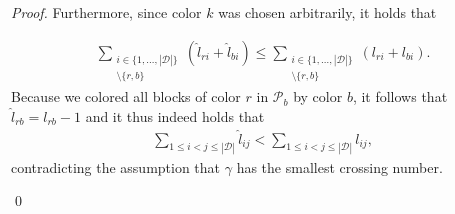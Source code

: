 \documentclass{llncs}
\begin{document}
\begin{proof}
Furthermore, since color $k$ was chosen arbitrarily, it holds that

\begin{align*}
\sum_{\substack{i \in \{1, \ldots, |\mathcal{D}|\}   \\ \setminus \{r,b\}}} (\hat l_{ri} + \hat l_{bi})    \leq  \sum_{\substack{i \in \{1, \ldots, |\mathcal{D}|\}   \\ \setminus \{r,b\}}} ( l_{ri} +  l_{bi}).
\end{align*}
Because we colored all blocks of color $r$ in $\mathcal{P}_b$ by color $b$, it follows that $\hat{l}_{rb} = l_{rb} -1$ and it thus indeed holds that 
 \begin{align*}
\sum_{1 \leq i < j \leq |\mathcal{D}|} \hat l_{ij} < \sum_{1 \leq i < j \leq |\mathcal{D}|} l_{ij},
\end{align*}
contradicting the assumption that $\gamma$ has the smallest crossing number.





\qed


\end{proof}
\end{document}
